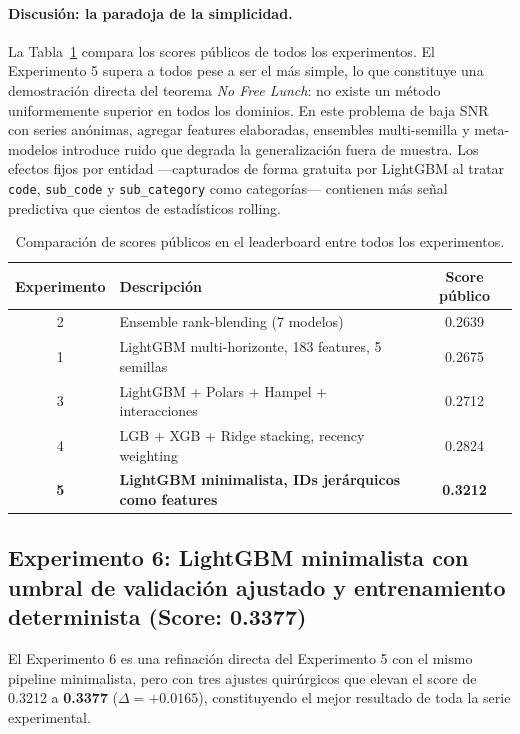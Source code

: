 \documentclass{article}
\begin{document}
\paragraph{Discusión: la paradoja de la simplicidad.}
La Tabla~\ref{tab:resumen_scores} compara los scores públicos de todos los experimentos. El Experimento 5 supera a todos pese a ser el más simple, lo que constituye una demostración directa del teorema \emph{No Free Lunch}: no existe un método uniformemente superior en todos los dominios. En este problema de baja SNR con series anónimas, agregar features elaboradas, ensembles multi-semilla y meta-modelos introduce ruido que degrada la generalización fuera de muestra. Los efectos fijos por entidad —capturados de forma gratuita por LightGBM al tratar \texttt{code}, \texttt{sub\_code} y \texttt{sub\_category} como categorías— contienen más señal predictiva que cientos de estadísticos rolling.

\begin{table}[h!]
  \caption{Comparación de scores públicos en el leaderboard entre todos los experimentos.}
  \label{tab:resumen_scores}
  \centering
  \begin{tabular}{clc}
    \toprule
    Experimento & Descripción & Score público \\
    \midrule
    2 & Ensemble rank-blending (7 modelos)                          & 0.2639 \\
    1 & LightGBM multi-horizonte, 183 features, 5 semillas          & 0.2675 \\
    3 & LightGBM + Polars + Hampel + interacciones                  & 0.2712 \\
    4 & LGB + XGB + Ridge stacking, recency weighting               & 0.2824 \\
    \textbf{5} & \textbf{LightGBM minimalista, IDs jerárquicos como features} & \textbf{0.3212} \\
    \bottomrule
  \end{tabular}
\end{table}

\subsection{Experimento 6: LightGBM minimalista con umbral de validación ajustado y entrenamiento determinista (Score: 0.3377)}

El Experimento 6 es una refinación directa del Experimento 5 con el mismo pipeline minimalista, pero con tres ajustes quirúrgicos que elevan el score de 0.3212 a \textbf{0.3377} ($\Delta = +0.0165$), constituyendo el mejor resultado de toda la serie experimental.
\end{document}

